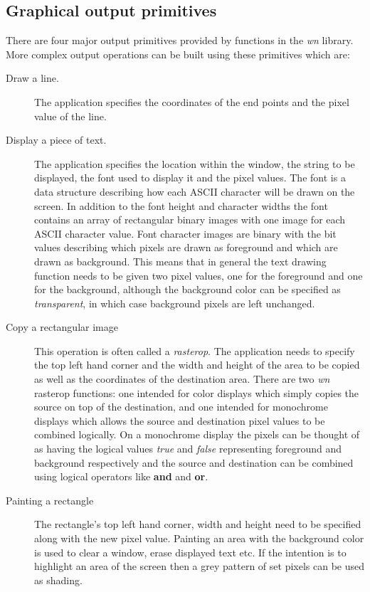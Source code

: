 \subsection{Graphical output primitives}
There are four major output primitives provided by functions in the
{\em wn} library.
More complex output operations can be built using these primitives
which are:
\begin{description}
\item[Draw a line.]
The application specifies the coordinates of the end points and the pixel
value of the line.
\item[Display a piece of text.]
The application specifies the location within the window, the string to be
displayed, the font used to display it and the pixel values.
The font is a data structure describing how each ASCII character will be drawn
on the screen.
In addition to the font height and character widths the font contains
an array of rectangular binary images with
one image for each ASCII character value.
Font character images are binary with the bit values describing which pixels
are drawn as foreground and which are drawn as background.
This means that in general the text drawing function needs to be given
two pixel values, one for the foreground and one for the background, although
the background color can be specified as {\em transparent}, in which case
background pixels are left unchanged.
\item[Copy a rectangular image]
This operation is often called a {\em rasterop}.
The application needs to specify the top left hand corner and the width and height
of the area to be copied as well as the coordinates of the destination
area. 
There are two {\em wn} rasterop functions: one intended for color
displays which simply copies the source on top of the destination,
and one intended for monochrome displays which allows the source
and destination pixel values to be combined logically.
On a monochrome display the pixels can be thought of as having the logical
values {\em true} and {\em false} representing foreground and background
respectively
and the source and destination can be combined using logical operators
like {\bf and} and {\bf or}.
\item[Painting a rectangle]
The rectangle's top left hand corner, width and height need to be specified
along with the new pixel value.
Painting an area with the background color is used to clear a window, erase
displayed text etc. If the intention is to highlight an area of the screen then
a grey pattern of set pixels can be used as shading.
\end{description}

